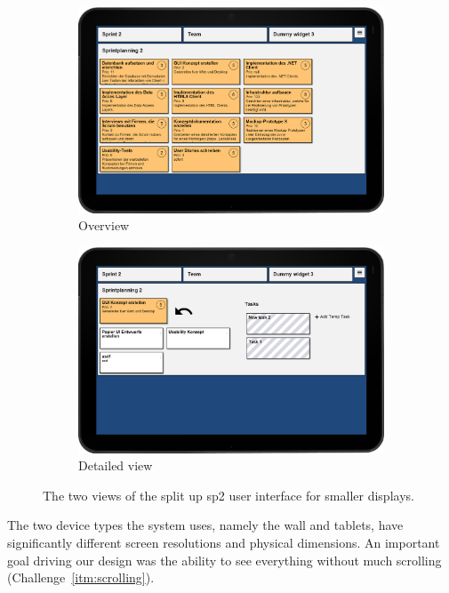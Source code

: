 \documentclass{sigchi}
\begin{document}
\begin{figure}
	\centering
	\begin{subfigure}[b]{1\columnwidth}
		\includegraphics[width=\textwidth]{figures/sp2-overview-framed}
		\caption{Overview}
		\label{fig:sp2-overview}
	\end{subfigure}%
	\quad
	\begin{subfigure}[b]{1\columnwidth}
		\includegraphics[width=\textwidth]{figures/sp2-detail-framed}
		\caption{Detailed view}
		\label{fig:sp2-detail}
	\end{subfigure}
	
	\caption{The two views of the split up \gls{sp2} user interface for smaller displays.}\label{fig:sp2-smallscreen-views}
\end{figure}


The two device types the system uses, namely the wall and tablets, have significantly different screen resolutions and physical dimensions. 
An important goal driving our design was the ability to see everything without much scrolling (Challenge~\ref{itm:scrolling}).
\end{document}
